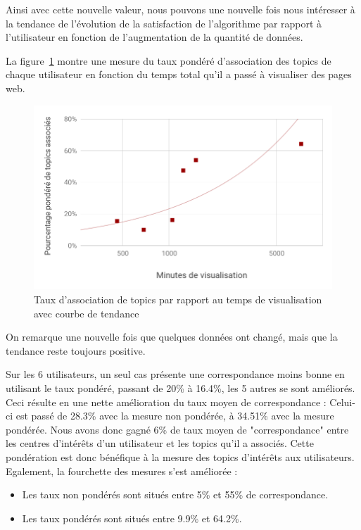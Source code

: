 			Ainsi avec cette nouvelle valeur, nous pouvons une nouvelle fois nous intéresser à la tendance de l'évolution de la satisfaction de l'algorithme par rapport à l'utilisateur en fonction de l'augmentation de la quantité de données.

			La figure~\ref{chart-4} montre une mesure du taux pondéré d'association des topics de chaque utilisateur en fonction du temps total qu'il a passé à visualiser des pages web.

			\begin{figure}[!h]
				\centering
				\includegraphics[height=0.6\textwidth]{images/results/chart-4}
				\caption{Taux d'association de topics par rapport au temps de visualisation avec courbe de tendance}
				\label{chart-4}
			\end{figure}

			On remarque une nouvelle fois que quelques données ont changé, mais que la tendance reste toujours positive. 

			Sur les 6 utilisateurs, un seul cas présente une correspondance moins bonne en utilisant le taux pondéré, passant de 20\% à 16.4\%, les 5 autres se sont améliorés. Ceci résulte en une nette amélioration du taux moyen de correspondance : Celui-ci est passé de 28.3\% avec la mesure non pondérée, à 34.51\% avec la mesure pondérée. Nous avons donc gagné 6\% de taux moyen de "correspondance" entre les centres d'intérêts d'un utilisateur et les topics qu'il a associés. Cette pondération est donc bénéfique à la mesure des topics d'intérêts aux utilisateurs. Egalement, la fourchette des mesures s'est améliorée :
			\begin{itemize}
				\item Les taux non pondérés sont situés entre 5\% et 55\% de correspondance.
				\item Les taux pondérés sont situés entre 9.9\% et 64.2\%.
			\end{itemize}


